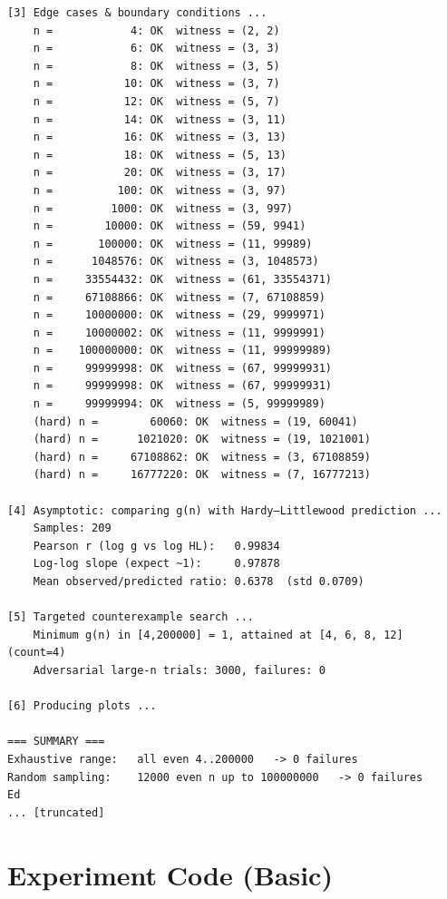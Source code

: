 \documentclass[11pt]{article}
\begin{document}
\begin{lstlisting}
[3] Edge cases & boundary conditions ...
    n =            4: OK  witness = (2, 2)
    n =            6: OK  witness = (3, 3)
    n =            8: OK  witness = (3, 5)
    n =           10: OK  witness = (3, 7)
    n =           12: OK  witness = (5, 7)
    n =           14: OK  witness = (3, 11)
    n =           16: OK  witness = (3, 13)
    n =           18: OK  witness = (5, 13)
    n =           20: OK  witness = (3, 17)
    n =          100: OK  witness = (3, 97)
    n =         1000: OK  witness = (3, 997)
    n =        10000: OK  witness = (59, 9941)
    n =       100000: OK  witness = (11, 99989)
    n =      1048576: OK  witness = (3, 1048573)
    n =     33554432: OK  witness = (61, 33554371)
    n =     67108866: OK  witness = (7, 67108859)
    n =     10000000: OK  witness = (29, 9999971)
    n =     10000002: OK  witness = (11, 9999991)
    n =    100000000: OK  witness = (11, 99999989)
    n =     99999998: OK  witness = (67, 99999931)
    n =     99999998: OK  witness = (67, 99999931)
    n =     99999994: OK  witness = (5, 99999989)
    (hard) n =        60060: OK  witness = (19, 60041)
    (hard) n =      1021020: OK  witness = (19, 1021001)
    (hard) n =     67108862: OK  witness = (3, 67108859)
    (hard) n =     16777220: OK  witness = (7, 16777213)

[4] Asymptotic: comparing g(n) with Hardy–Littlewood prediction ...
    Samples: 209
    Pearson r (log g vs log HL):   0.99834
    Log-log slope (expect ~1):     0.97878
    Mean observed/predicted ratio: 0.6378  (std 0.0709)

[5] Targeted counterexample search ...
    Minimum g(n) in [4,200000] = 1, attained at [4, 6, 8, 12] (count=4)
    Adversarial large-n trials: 3000, failures: 0

[6] Producing plots ...

=== SUMMARY ===
Exhaustive range:   all even 4..200000   -> 0 failures
Random sampling:    12000 even n up to 100000000   -> 0 failures
Ed
... [truncated]
\end{lstlisting}


\section{Experiment Code (Basic)}
\end{document}
